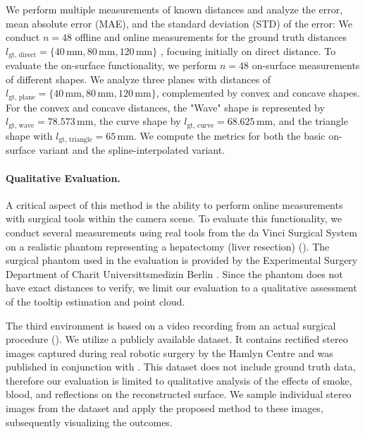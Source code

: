 \documentclass[letterpaper]{article} %
\begin{document}
We perform multiple measurements of known distances and analyze the error, mean absolute error (MAE), and the standard deviation (STD) of the error: We conduct $n=48$ offline and online measurements for the ground truth distances $l_{\text{gt, direct}} = \{40\, \text{mm}, 80\, \text{mm}, 120\, \text{mm}\}$
, focusing initially on direct distance. To evaluate the on-surface functionality, we perform $n=48$ on-surface measurements of different shapes. We analyze three planes with distances of \( l_{\text{gt, plane}} = \{40\, \text{mm}, 80\, \text{mm}, 120\, \text{mm}\} \), complemented by convex and concave shapes. For the convex and concave distances, the "Wave" shape is represented by $ l_{\text{gt, wave}} = 78.573\, \text{mm} $, the curve shape by $ l_{\text{gt, curve}} = 68.625\, \text{mm} $, and the triangle shape with $ l_{\text{gt, triangle}} = 65\, \text{mm} $. We compute the metrics for both the basic on-surface variant and the spline-interpolated variant.


\paragraph{Qualitative Evaluation.} A critical aspect of this method is the ability to perform online measurements with surgical tools within the camera scene. To evaluate this functionality, we conduct several measurements using real tools from the da Vinci Surgical System on a realistic phantom representing a hepatectomy (liver resection) (). The surgical phantom used in the evaluation is provided by the Experimental Surgery Department of Charit Universittsmedizin Berlin \cite{remde_xr-developer_2023}. Since the phantom does not have exact distances to verify, we limit our evaluation to a qualitative assessment of the tooltip estimation and point cloud.

The third environment is based on a video recording from an actual surgical procedure \cite{ye_self-supervised_2017} (). We utilize a publicly available dataset. It contains rectified stereo images captured during real robotic surgery by the Hamlyn Centre and was published in conjunction with \citet{ye_self-supervised_2017}. This dataset does not include ground truth data, therefore our evaluation is limited to qualitative analysis of the effects of smoke, blood, and reflections on the reconstructed surface. We sample individual stereo images from the dataset and apply the proposed method to these images, subsequently visualizing the outcomes.
\end{document}
